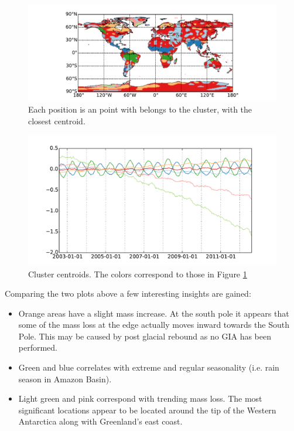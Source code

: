 \begin{figure}[H]
	\center
	\includegraphics[width=\textwidth]{figures/kmeans-world}
	\caption{Each position is an point with belongs to the cluster, with the closest centroid.}
	\label{fig:kmeans-world}
\end{figure}
\begin{figure}[H]
	\center
	\includegraphics[width=\textwidth]{figures/kmeans-centroids}
	\caption{Cluster centroids. The colors correspond to those in Figure \ref{fig:kmeans-world}}
	\label{fig:kmeans-centroids}
\end{figure}

Comparing the two plots above a few interesting insights are gained:
\begin{itemize}
	\item Orange areas have a slight mass increase. At the south pole it appears that some of the mass loss at the edge actually moves inward towards the South Pole. This may be caused by post glacial rebound as no GIA has been performed.
	\item  Green and blue correlates with extreme and regular seasonality (i.e. rain season in Amazon Basin).
	\item Light green and pink correspond with trending mass loss. The most significant locations appear to be located around the tip of the Western Antarctica along with Greenland's east coast.
\end{itemize}
